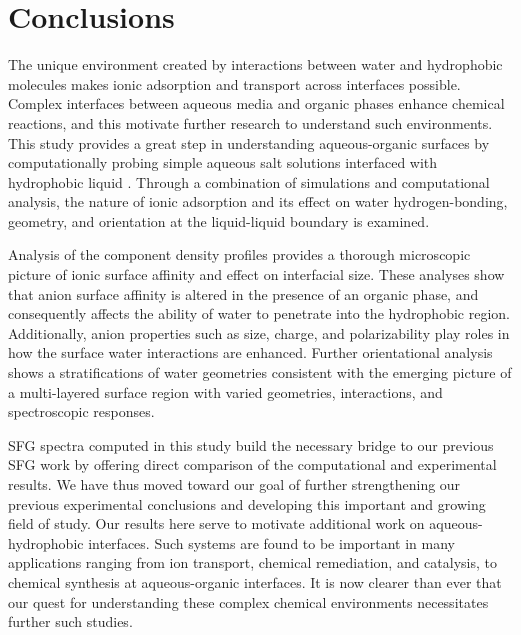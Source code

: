 \section{Conclusions}

The unique environment created by interactions between water and hydrophobic molecules makes ionic adsorption and transport across interfaces possible. Complex interfaces between aqueous media and organic phases enhance chemical reactions, and this motivate further research to understand such environments. This study provides a great step in understanding aqueous-organic surfaces by computationally probing simple aqueous salt solutions interfaced with hydrophobic liquid \ctc. Through a combination of simulations and computational analysis, the nature of ionic adsorption and its effect on water hydrogen-bonding, geometry, and orientation at the liquid-liquid boundary is examined.

Analysis of the component density profiles provides a thorough microscopic picture of ionic surface affinity and effect on interfacial size. These analyses show that anion surface affinity is altered in the presence of an organic phase, and consequently affects the ability of water to penetrate into the hydrophobic region. Additionally, anion properties such as size, charge, and polarizability play roles in how the surface water interactions are enhanced. Further orientational analysis shows a stratifications of water geometries consistent with the emerging picture of a multi-layered surface region with varied geometries, interactions, and spectroscopic responses.

SFG spectra computed in this study build the necessary bridge to our previous SFG work by offering direct comparison of the computational and experimental results. We have thus moved toward our goal of further strengthening our previous experimental conclusions and developing this important and growing field of study. Our results here serve to motivate additional work on aqueous-hydrophobic interfaces. Such systems are found to be important in many applications ranging from ion transport, chemical remediation, and catalysis, to chemical synthesis at aqueous-organic interfaces. It is now clearer than ever that our quest for understanding these complex chemical environments necessitates further such studies.

